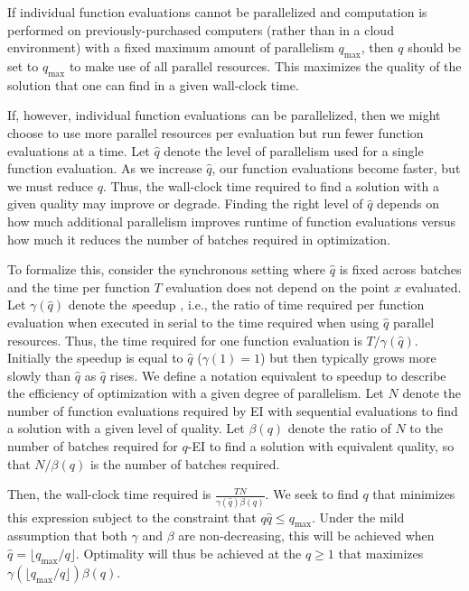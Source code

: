 \documentclass[paper=letter]{scrartcl}
\begin{document}
If individual function evaluations cannot be parallelized and computation is performed on previously-purchased computers (rather than in a cloud environment) with a fixed maximum amount of parallelism $q_{\max}$, then $q$ should be set to  $q_{\max}$ to make use of all parallel resources.  This maximizes the quality of the solution that one can find in a given wall-clock time.

If, however, individual function evaluations {\textit can} be parallelized, then we might choose to use more parallel resources per evaluation but run fewer function evaluations at a time.
Let $\hat{q}$ denote the level of parallelism used for a single function evaluation. 
As we increase $\hat{q}$, our function evaluations become faster, but we must reduce $q$.  Thus, the wall-clock time required to find a solution with a given quality may improve or degrade.  Finding the right level of $\hat{q}$ depends on how much  additional parallelism improves runtime of function evaluations versus how much it reduces the number of batches required in optimization.

To formalize this, consider the synchronous setting where $\hat{q}$ is fixed across batches 
and the time per function $T$ evaluation does not depend on the point $x$ evaluated.  
Let $\gamma(\hat{q})$ denote the {\textit speedup} \citep{quinn1994parallel}, i.e., the ratio of time required per function evaluation when executed in serial to the time required when using $\hat{q}$ parallel resources.  Thus, the time required for one function evaluation is $T / \gamma(\hat{q})$.
Initially the speedup is equal to $\hat{q}$ 
($\gamma(1)=1$) but then typically grows more 
slowly than $\hat{q}$ as $\hat{q}$ rises.
We define a notation equivalent to speedup to describe the efficiency of optimization with a given degree of parallelism.
Let $N$ denote the number of function evaluations required by EI with sequential evaluations to find a solution with a given level of quality.
Let $\beta(q)$ denote the ratio of $N$ to the number of batches required for $q$-EI to find a solution with equivalent quality, so that $N/\beta(q)$ is the number of batches required.

Then, the wall-clock time required is $\frac{TN}{\gamma(\hat{q}) \beta(q)}$. 
We seek to find $q$ that minimizes this expression 
subject to the constraint that $q \hat{q} \le q_{\max}$.  Under the mild assumption that both $\gamma$ and $\beta$ are non-decreasing, this will be achieved when $\hat{q} = \lfloor q_{\max} / q \rfloor$.
Optimality will thus be achieved at the $q\ge1$ that maximizes $\gamma(\lfloor q_{\max}/q \rfloor)\beta(q)$.
\end{document}
